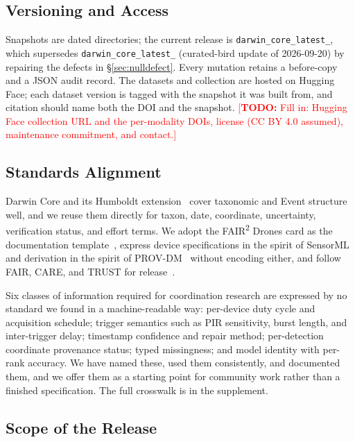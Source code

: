 \documentclass[sigconf]{acmart}
\newcommand{\TODO}[1]{\textcolor{red}{\footnotesize[\textbf{TODO:} #1]}}
\newcommand{\TODO}[1]{}
\begin{document}
\subsection{Versioning and Access}

Snapshots are dated directories; the current release is
\texttt{darwin\_core\_\allowbreak latest\_}, which supersedes
\texttt{darwin\_core\_\allowbreak latest\_} (curated-bird update of
2026-09-20) by repairing the defects in \S\ref{sec:nulldefect}. Every
mutation retains a before-copy and a JSON audit record. The datasets and
collection are hosted on Hugging Face; each dataset version is tagged
with the snapshot it was built from, and citation should name both the
DOI and the snapshot.
\TODO{Fill in: Hugging Face collection URL and the per-modality DOIs,
license (CC BY 4.0 assumed), maintenance commitment, and contact.}

\subsection{Standards Alignment}
\label{sec:crosswalk}

Darwin Core and its Humboldt extension~\cite{tdwgHumboldt} cover
taxonomic and Event structure well, and we reuse them directly for
taxon, date, coordinate, uncertainty, verification status, and effort
terms. We adopt the FAIR\textsuperscript{2} Drones card as the
documentation template~\cite{pierrat2025proximal}, express device
specifications in the spirit of SensorML~\cite{ogcSensorML} and
derivation in the spirit of PROV-DM~\cite{w3cProvDM} without encoding
either, and follow FAIR, CARE, and TRUST for
release~\cite{wilkinson2016fair,carroll2020care,lin2020trust}.

Six classes of information required for coordination research are
expressed by no standard we found in a machine-readable way: per-device
duty cycle and acquisition schedule; trigger semantics such as PIR
sensitivity, burst length, and inter-trigger delay; timestamp confidence
and repair method; per-detection coordinate provenance status; typed
missingness; and model identity with per-rank accuracy. We have named
these, used them consistently, and documented them, and we offer them as
a starting point for community work rather than a finished
specification. The full crosswalk is in the supplement.

\subsection{Scope of the Release}
\end{document}
